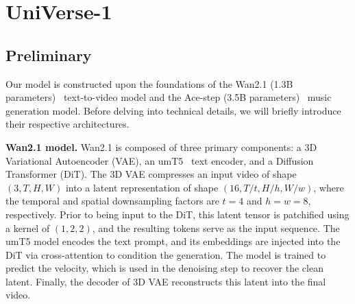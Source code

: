 \section{UniVerse-1}

\subsection{Preliminary}
\label{sec:preliminary}


Our model is constructed upon the foundations of the Wan2.1 (1.3B parameters)~\cite{wan2025wan} text-to-video model and the Ace-step (3.5B parameters)~\cite{gong2025ace} music generation model. Before delving into technical details, we will briefly introduce their respective architectures.



\textbf{Wan2.1 model.} Wan2.1 is composed of three primary components: a 3D Variational Autoencoder (VAE), an umT5~\cite{chung2023unimax} text encoder, and a Diffusion Transformer (DiT). The 3D VAE compresses an input video of shape $(3, T, H, W)$ into a latent representation of shape $(16, T/t, H/h, W/w)$, where the temporal and spatial downsampling factors are $t=4$ and $h=w=8$, respectively. Prior to being input to the DiT, this latent tensor is patchified using a kernel of $(1, 2, 2)$, and the resulting tokens serve as the input sequence. The umT5 model encodes the text prompt, and its embeddings are injected into the DiT via cross-attention to condition the generation. The model is trained to predict the velocity, which is used in the denoising step to recover the clean latent. Finally, the decoder of 3D VAE reconstructs this latent into the final video.

